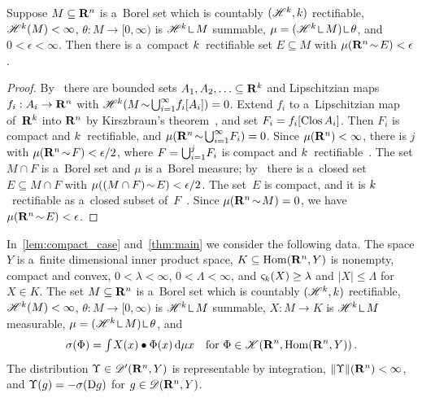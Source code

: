 \documentclass[a4paper,twoside,leqno]{article}
\newcommand{\sv}[1]{\varsigma_{#1}}        %
\begin{document}
\begin{lemma}
    \label{lem:inner}
    Suppose $M \subseteq \mathbf{R}^{n}$ is a~Borel set which is countably $(\mathscr{H}^{k},k)$
    rectifiable, $\mathscr{H}^{k}(M) < \infty$, $\theta : M \to [0,\infty)$ is $\HM^{\vdim} \restrict
    M$ summable, $\mu = (\HM^{\vdim} \restrict M) \restrict \theta$, and $0 < \epsilon < \infty$.
    Then there is a~compact $k$~rectifiable set $E \subseteq M$ with $\mu(\mathbf{R}^{n} \!\sim\!
    E) < \epsilon$.
\end{lemma}

\begin{proof}
    By~\cite[3.2.14]{Federer1969} there are bounded sets $A_1, A_2, \ldots \subseteq \mathbf{R}^{k}$
    and Lipschitzian maps $f_i : A_i \to \mathbf{R}^{n}$ with $\mathscr{H}^{k}(M \!\sim\!
    {{\textstyle \bigcup}}_{i=1}^\infty f_i[A_i]) = 0$. Extend $f_i$ to a~Lipschitzian map of~$\mathbf{R}^{k}$ into
    $\mathbf{R}^{n}$ by Kirszbraun's theorem~\cite[2.10.43]{Federer1969}, and set $F_i = f_i[\mathop{\mathrm{Clos}}A_i]$. Then $F_i$ is compact and $k$~rectifiable, and $\mu(\mathbf{R}^{n} \!\sim\!
    {{\textstyle \bigcup}}_{i=1}^\infty F_i) = 0$. Since $\mu(\mathbf{R}^{n}) < \infty$, there is $j$ with
    $\mu(\mathbf{R}^{n} \!\sim\! F) < \epsilon/2$, where $F = {{\textstyle \bigcup}}_{i=1}^j F_i$ is compact and
    $k$~rectifiable~\cite[3.2.14]{Federer1969}. The set $M \cap F$ is a~Borel set and $\mu$ is
    a~Borel measure; by~\cite[2.2.2]{Federer1969} there is a~closed set $E \subseteq M \cap F$
    with $\mu((M \cap F) \!\sim\! E) < \epsilon/2$. The set~$E$ is compact, and it is
    $k$~rectifiable as a~closed subset of~$F$~\cite[3.2.14]{Federer1969}. Since $\mu(\mathbf{R}^{n}
    \!\sim\! M) = 0$, we have $\mu(\mathbf{R}^{n} \!\sim\! E) < \epsilon$.
\end{proof}

\begin{miniremark}
    \label{mr:hypotheses_main}
    In~\ref{lem:compact_case} and~\ref{thm:main} we consider the following data. The space $Y$
    is a~finite dimensional inner product space, $K \subseteq \operatorname{Hom}(\mathbf{R}^{n},Y)$ is nonempty,
    compact and convex, $0 < \lambda < \infty$, $0 < \Lambda < \infty$, and $\sv{\vdim}(X) \ge
    \lambda$ and $|X| \le \Lambda$ for $X \in K$. The set $M \subseteq \mathbf{R}^{n}$ is a~Borel set
    which is countably $(\mathscr{H}^{k},k)$ rectifiable, $\mathscr{H}^{k}(M) < \infty$, $\theta : M
    \to [0,\infty)$ is $\HM^{\vdim} \restrict M$ summable, $X : M \to K$ is $\HM^{\vdim}
    \restrict M$ measurable, $\mu = (\HM^{\vdim} \restrict M) \restrict \theta$, and
    \begin{displaymath}
        \sigma(\Phi) = {\textstyle\int_{}^{}} X(x) \bullet \Phi(x) \,\mathrm{d} \mu x
        \quad \text{for $\Phi \in \mathscr{K}(\mathbf{R}^{n},\operatorname{Hom}(\mathbf{R}^{n},Y))$} \,.
    \end{displaymath}
    The distribution $\Upsilon \in \mathscr{D}'(\mathbf{R}^{n},Y)$ is representable by integration,
    $\|\Upsilon\|(\mathbf{R}^{n}) < \infty$, and $\Upsilon(g) = - \sigma(\mathrm{D} g)$ for $g \in
    \mathscr{D}(\mathbf{R}^{n},Y)$.
\end{miniremark}
\end{document}
